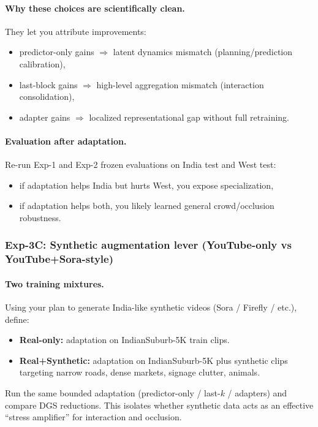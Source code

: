 \paragraph{Why these choices are scientifically clean.}
They let you attribute improvements:
\begin{itemize}[leftmargin=*,itemsep=2pt]
  \item predictor-only gains $\Rightarrow$ latent dynamics mismatch (planning/prediction calibration),
  \item last-block gains $\Rightarrow$ high-level aggregation mismatch (interaction consolidation),
  \item adapter gains $\Rightarrow$ localized representational gap without full retraining.
\end{itemize}

\paragraph{Evaluation after adaptation.}
Re-run Exp-1 and Exp-2 frozen evaluations on India test and West test:
\begin{itemize}[leftmargin=*,itemsep=2pt]
  \item if adaptation helps India but hurts West, you expose specialization,
  \item if adaptation helps both, you likely learned general crowd/occlusion robustness.
\end{itemize}

\subsubsection{Exp-3C: Synthetic augmentation lever (YouTube-only vs YouTube+Sora-style)}

\paragraph{Two training mixtures.}
Using your plan to generate India-like synthetic videos (Sora / Firefly / etc.), define:
\begin{itemize}[leftmargin=*,itemsep=2pt]
  \item \textbf{Real-only:} adaptation on IndianSuburb-5K train clips.
  \item \textbf{Real+Synthetic:} adaptation on IndianSuburb-5K plus synthetic clips targeting narrow roads, dense markets, signage clutter, animals.
\end{itemize}
Run the same bounded adaptation (predictor-only / last-$k$ / adapters) and compare DGS reductions. This isolates whether synthetic data acts as an effective “stress amplifier” for interaction and occlusion.

